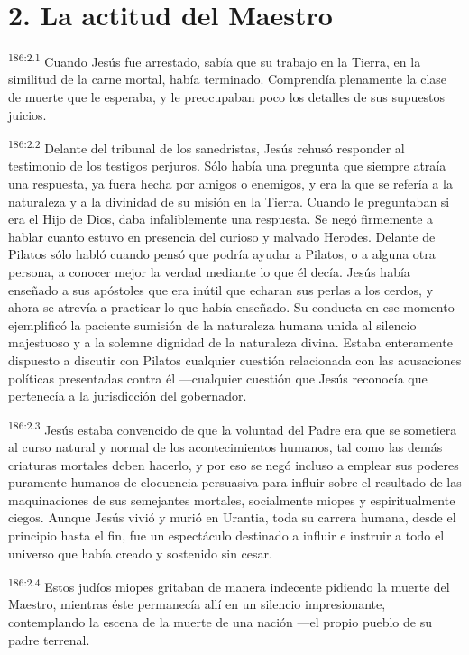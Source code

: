 \section*{2. La actitud del Maestro}
\par 
\textsuperscript{186:2.1} Cuando Jesús fue arrestado, sabía que su trabajo en la Tierra, en la similitud de la carne mortal, había terminado. Comprendía plenamente la clase de muerte que le esperaba, y le preocupaban poco los detalles de sus supuestos juicios.

\par 
\textsuperscript{186:2.2} Delante del tribunal de los sanedristas, Jesús rehusó responder al testimonio de los testigos perjuros. Sólo había una pregunta que siempre atraía una respuesta, ya fuera hecha por amigos o enemigos, y era la que se refería a la naturaleza y a la divinidad de su misión en la Tierra. Cuando le preguntaban si era el Hijo de Dios, daba infaliblemente una respuesta. Se negó firmemente a hablar cuanto estuvo en presencia del curioso y malvado Herodes. Delante de Pilatos sólo habló cuando pensó que podría ayudar a Pilatos, o a alguna otra persona, a conocer mejor la verdad mediante lo que él decía. Jesús había enseñado a sus apóstoles que era inútil que echaran sus perlas a los cerdos, y ahora se atrevía a practicar lo que había enseñado. Su conducta en ese momento ejemplificó la paciente sumisión de la naturaleza humana unida al silencio majestuoso y a la solemne dignidad de la naturaleza divina. Estaba enteramente dispuesto a discutir con Pilatos cualquier cuestión relacionada con las acusaciones políticas presentadas contra él ---cualquier cuestión que Jesús reconocía que pertenecía a la jurisdicción del gobernador.

\par 
\textsuperscript{186:2.3} Jesús estaba convencido de que la voluntad del Padre era que se sometiera al curso natural y normal de los acontecimientos humanos, tal como las demás criaturas mortales deben hacerlo, y por eso se negó incluso a emplear sus poderes puramente humanos de elocuencia persuasiva para influir sobre el resultado de las maquinaciones de sus semejantes mortales, socialmente miopes y espiritualmente ciegos. Aunque Jesús vivió y murió en Urantia, toda su carrera humana, desde el principio hasta el fin, fue un espectáculo destinado a influir e instruir a todo el universo que había creado y sostenido sin cesar.

\par 
\textsuperscript{186:2.4} Estos judíos miopes gritaban de manera indecente pidiendo la muerte del Maestro, mientras éste permanecía allí en un silencio impresionante, contemplando la escena de la muerte de una nación ---el propio pueblo de su padre terrenal.

